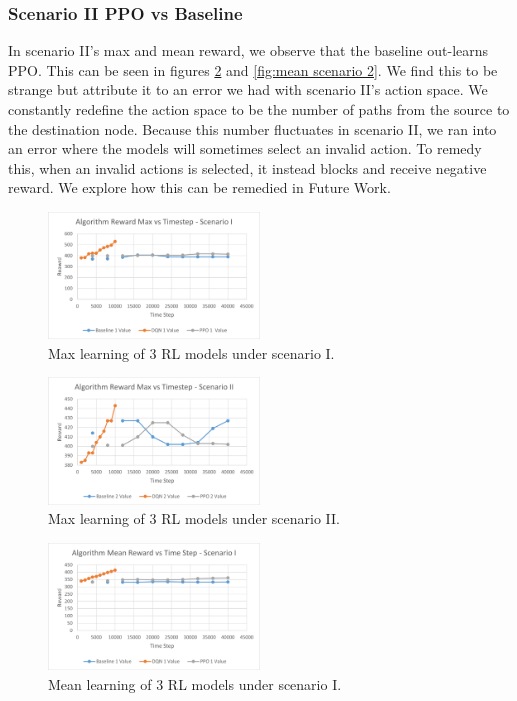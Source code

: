 \documentclass[conference]{IEEEtran}
\begin{document}
\subsubsection{Scenario II PPO vs Baseline}
In scenario II's max and mean reward, we observe that the baseline out-learns PPO. This can be seen in figures \ref{fig:max scenario 2} and \ref{fig:mean scenario 2}. We find this to be strange but attribute it to an error we had with scenario II's action space. We constantly redefine the action space to be the number of paths from the source to the destination node. Because this number fluctuates in scenario II, we ran into an error where the models will sometimes select an invalid action. To remedy this, when an invalid actions is selected, it instead blocks and receive negative reward. We explore how this can be remedied in Future Work.

\begin{figure} [ht]
    \centering
    \includegraphics[width = 0.5\textwidth]{Scenario 1 Max Reward.png}
    \caption{Max learning of 3 RL models under scenario I.}
    \label{fig:max scenario 1}
\end{figure}

\begin{figure} [ht]
    \centering
    \includegraphics[width = 0.5\textwidth]{Scenario 2 Max Reward.png}
    \caption{Max learning of 3 RL models under scenario II.}
    \label{fig:max scenario 2}
\end{figure}

\begin{figure} [ht]
    \centering
    \includegraphics[width = 0.5\textwidth]{Scenario 1 Mean Reward.png}
    \caption{Mean learning of 3 RL models under scenario I.}
    \label{fig:mean scenario 1}
\end{figure}
\end{document}
